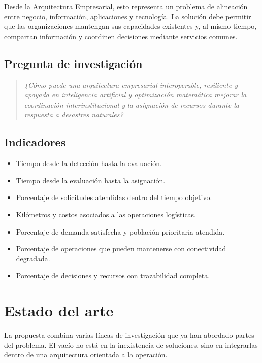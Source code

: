 \documentclass[11pt,a4paper]{article}
\begin{document}
Desde la Arquitectura Empresarial, esto representa un problema de alineación
entre negocio, información, aplicaciones y tecnología. La solución debe
permitir que las organizaciones mantengan sus capacidades existentes y, al
mismo tiempo, compartan información y coordinen decisiones mediante servicios
comunes.

\subsection{Pregunta de investigación}

\begin{quote}
\itshape
¿Cómo puede una arquitectura empresarial interoperable, resiliente y apoyada
en inteligencia artificial y optimización matemática mejorar la coordinación
interinstitucional y la asignación de recursos durante la respuesta a
desastres naturales?
\end{quote}

\subsection{Indicadores}

\begin{itemize}[leftmargin=*]
  \item Tiempo desde la detección hasta la evaluación.
  \item Tiempo desde la evaluación hasta la asignación.
  \item Porcentaje de solicitudes atendidas dentro del tiempo objetivo.
  \item Kilómetros y costos asociados a las operaciones logísticas.
  \item Porcentaje de demanda satisfecha y población prioritaria atendida.
  \item Porcentaje de operaciones que pueden mantenerse con conectividad
        degradada.
  \item Porcentaje de decisiones y recursos con trazabilidad completa.
\end{itemize}

\section{Estado del arte}

La propuesta combina varias líneas de investigación que ya han abordado partes
del problema. El vacío no está en la inexistencia de soluciones, sino en
integrarlas dentro de una arquitectura orientada a la operación.
\end{document}
